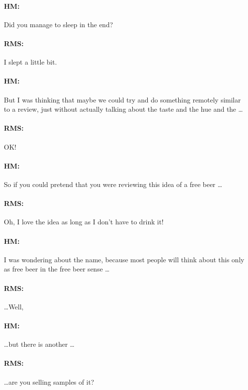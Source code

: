 \paragraph{HM:}{Did you manage to sleep in the end?}

\paragraph{RMS:}{I slept a little bit.}

\paragraph{HM:}{But I was thinking that maybe we could try and do something
remotely similar to a review, just without actually talking about the taste and
the hue and the \dots}

\paragraph{RMS:}{OK!}

\paragraph{HM:}{So if you could pretend that you were reviewing this idea of a
free beer \dots}

\paragraph{RMS:}{Oh, I love the idea as long as I don't have to drink it!}

\paragraph{HM:}{I was wondering about the name, because most people will think
about this only as free beer in the free beer sense \dots}

\paragraph{RMS:}{\dots Well,}

\paragraph{HM:}{\dots but there is another \dots}

\paragraph{RMS:}{\dots are you selling samples of it?}

